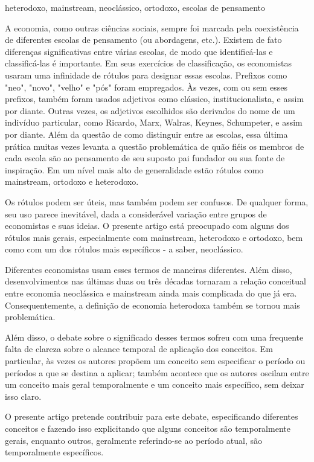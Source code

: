 \documentclass[12pt]{article}
\begin{document}
heterodoxo, mainstream, neoclássico, ortodoxo, escolas de pensamento

A economia, como outras ciências sociais, sempre foi marcada pela coexistência de diferentes escolas de pensamento (ou abordagens, etc.). Existem de fato diferenças significativas entre várias escolas, de modo que identificá-las e classificá-las é importante. Em seus exercícios de classificação, os economistas usaram uma infinidade de rótulos para designar essas escolas. Prefixos como "neo", "novo", "velho" e "pós" foram empregados. Às vezes, com ou sem esses prefixos, também foram usados adjetivos como clássico, institucionalista, e assim por diante. Outras vezes, os adjetivos escolhidos são derivados do nome de um indivíduo particular, como Ricardo, Marx, Walras, Keynes, Schumpeter, e assim por diante. Além da questão de como distinguir entre as escolas, essa última prática muitas vezes levanta a questão problemática de quão fiéis os membros de cada escola são ao pensamento de seu suposto pai fundador ou sua fonte de inspiração. Em um nível mais alto de generalidade estão rótulos como mainstream, ortodoxo e heterodoxo.

Os rótulos podem ser úteis, mas também podem ser confusos. De qualquer forma, seu uso parece inevitável, dada a considerável variação entre grupos de economistas e suas ideias. O presente artigo está preocupado com alguns dos rótulos mais gerais, especialmente com mainstream, heterodoxo e ortodoxo, bem como com um dos rótulos mais específicos - a saber, neoclássico.

Diferentes economistas usam esses termos de maneiras diferentes. Além disso, desenvolvimentos nas últimas duas ou três décadas tornaram a relação conceitual entre economia neoclássica e mainstream ainda mais complicada do que já era. Consequentemente, a definição de economia heterodoxa também se tornou mais problemática.

Além disso, o debate sobre o significado desses termos sofreu com uma frequente falta de clareza sobre o alcance temporal de aplicação dos conceitos. Em particular, às vezes os autores propõem um conceito sem especificar o período ou períodos a que se destina a aplicar; também acontece que os autores oscilam entre um conceito mais geral temporalmente e um conceito mais específico, sem deixar isso claro.

O presente artigo pretende contribuir para este debate, especificando diferentes conceitos e fazendo isso explicitando que alguns conceitos são temporalmente gerais, enquanto outros, geralmente referindo-se ao período atual, são temporalmente específicos.
\end{document}
